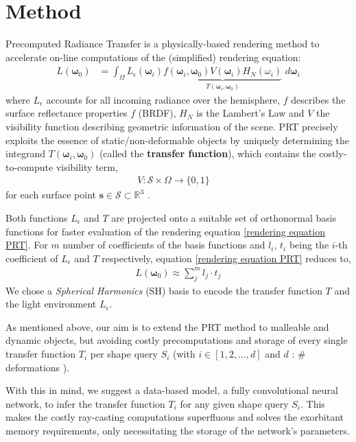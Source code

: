 \section{Method}
Precomputed Radiance Transfer  is a physically-based rendering method to accelerate on-line computations of the (simplified) rendering equation:
\begin{align}
L(\bm{\omega}_0 ) &= 
\int_{\Omega}   L_{\epsilon}(\bm{\omega}_i ) 
\underbrace{f(\bm{\omega}_i,\bm{\omega}_0) 
V(\bm{\omega}_i) H_N(\omega_i) }_{T(\bm{\omega}_i,\bm{\omega}_0) }
\,  \, d\bm{\omega}_i 
\label{rendering equation PRT}
\end{align}
where $L_{\epsilon}$ accounts for all incoming radiance over the hemisphere, $f$  describes the surface reflectance properties $f$ (BRDF), $H_N$ is the Lambert's Law and $V$ the visibility function describing geometric information of the scene. PRT precisely exploits the essence of static/non-deformable objects by uniquely determining the integrand $T(\bm{\omega}_i,\bm{\omega}_0)$ (called the \textbf{transfer function}), which contains the costly-to-compute  visibility term,
\begin{align*}
V :  \mathcal{S}  \times \Omega \rightarrow \{0,1\} \quad
\end{align*}
for each surface point $\bm{s} \in \mathcal{S} \subset \mathbb{R}^3$ \cite{CohenBook}. 

Both functions $L_{\epsilon} $ and $T$  are projected onto a suitable set of orthonormal basis functions for faster evaluation of the rendering equation \ref{rendering equation PRT}. 
For $m$ number of coefficients of the basis functions and $l_i$, $t_i$ being the $i$-th coefficient of $L_{\epsilon} $ and $T$ respectively, equation \ref{rendering equation PRT} reduces to, \cite{sloan2002precomputed} 
\begin{align}
L(\bm{\omega}_0 ) \approx \sum_{j}^{m} l_j \cdot t_j 
\label{Eq: Reduced Rendering Eq}
\end{align}
We chose a \textit{Spherical Harmonics} (SH) basis to encode the transfer function $T$ and the light environment $L_{\epsilon}$.

As mentioned above, our aim is to extend the PRT method to malleable and dynamic objects, but avoiding costly precomputations and storage of every single transfer function $T_i$ per shape query $S_i$ (with $i \in [1,2,\dots, d]$ and $d$ : $\#$ deformations ).

With this in mind, we suggest a data-based model, a fully convolutional neural network, to infer the transfer function $T_i$ for any given shape query $S_i$. 
This makes the costly ray-casting computations superfluous and solves the exorbitant memory requirements, only necessitating the storage of the network's parameters.

